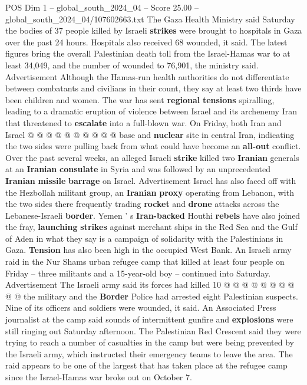 \begin{textsample}{POS Dim 1 – global\_south\_2024\_04 – Score 25.00 – global\_south\_2024\_04/107602663.txt}
The Gaza Health Ministry said Saturday the bodies of 37 people killed by Israeli \textbf{strikes} were brought to hospitals in Gaza over the past 24 hours.
Hospitals also received 68 wounded, it said.
The latest figures bring the overall Palestinian death toll from the Israel-Hamas war to at least 34,049, and the number of wounded to 76,901, the ministry said.
Advertisement Although the Hamas-run health authorities do not differentiate between combatants and civilians in their count, they say at least two thirds have been children and women.
The war has sent \textbf{regional} \textbf{tensions} spiralling, leading to a dramatic eruption of violence between Israel and its archenemy Iran that threatened to \textbf{escalate} into a full-blown war.
On Friday, both Iran and Israel @ @ @ @ @ @ @ @ @ @ base and \textbf{nuclear} site in central Iran, indicating the two sides were pulling back from what could have become an \textbf{all-out} conflict.
Over the past several weeks, an alleged Israeli \textbf{strike} killed two \textbf{Iranian} generals at an \textbf{Iranian} \textbf{consulate} in Syria and was followed by an unprecedented \textbf{Iranian} \textbf{missile} \textbf{barrage} on Israel.
Advertisement Israel has also faced off with the Hezbollah militant group, an \textbf{Iranian} \textbf{proxy} operating from Lebanon, with the two sides there frequently trading \textbf{rocket} and \textbf{drone} attacks across the Lebanese-Israeli \textbf{border}.
Yemen ' s \textbf{Iran-backed} Houthi \textbf{rebels} have also joined the fray, \textbf{launching} \textbf{strikes} against merchant ships in the Red Sea and the Gulf of Aden in what they say is a campaign of solidarity with the Palestinians in Gaza. \textbf{Tension} has also been high in the occupied West Bank.
An Israeli army raid in the Nur Shams urban refugee camp that killed at least four people on Friday -- three militants and a 15-year-old boy -- continued into Saturday.
Advertisement The Israeli army said its forces had killed 10 @ @ @ @ @ @ @ @ @ @ the military and the \textbf{Border} Police had arrested eight Palestinian suspects.
Nine of its officers and soldiers were wounded, it said.
An Associated Press journalist at the camp said sounds of intermittent gunfire and \textbf{explosions} were still ringing out Saturday afternoon.
The Palestinian Red Crescent said they were trying to reach a number of casualties in the camp but were being prevented by the Israeli army, which instructed their emergency teams to leave the area.
The raid appears to be one of the largest that has taken place at the refugee camp since the Israel-Hamas war broke out on October 7.

\end{textsample}
